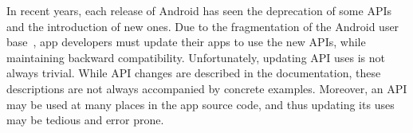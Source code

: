 In recent years, each release of Android has seen the deprecation of some
APIs and the introduction of new ones.  Due to the fragmentation of the
Android user base~\cite{he2018understanding,li2018cid}, app developers must update their apps to use the new
APIs, while maintaining backward compatibility.  Unfortunately, updating
API uses is not always trivial.  While API changes are described in the
documentation, these descriptions are not always accompanied by concrete
examples.  Moreover, an API may be used at many places in the app source
code, and thus updating its uses may be tedious and error prone.




